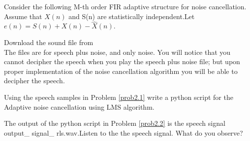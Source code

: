 \documentclass[journal,12pt,twocolumn]{IEEEtran}
\begin{document}
Consider the following M-th order FIR adaptive structure for noise cancellation.\\

Assume that $X(n)$ and S(n) are statistically independent.Let $e(n)=S(n)+X(n)-\hat X(n)$.
\begin{problem}
Download the sound file from\\
The files are for speech plus noise, and only noise. You will notice that you cannot decipher the speech when you play the speech plus noise file; but upon proper implementation of the noise cancellation algorithm you will be able to decipher the speech.\\
\label{prob2.1}
\end{problem}
\begin{problem}
Using the speech samples in Problem \ref{prob2.1} write a python script for the Adaptive noise cancellation using LMS algorithm.\\ \label{prob2.2}
\end{problem}
\solution
%	  	  
\begin{problem}
The output of the python script in Problem \ref{prob2.2} is the speech signal output\_ signal\_ rls.wav.Listen to the the speech signal. What do you observe?	 
\end{problem} 
\end{document}
